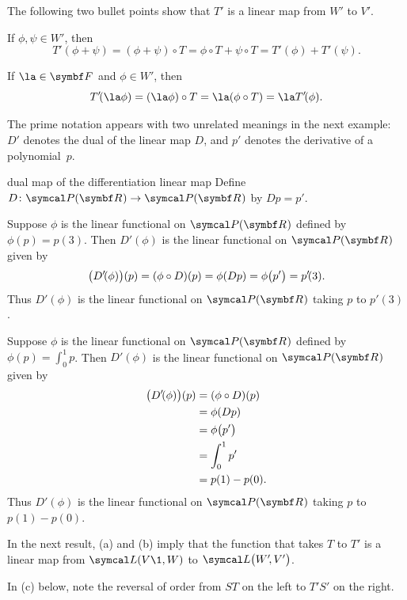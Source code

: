 The following two bullet points show that $T'$ is a linear map from $W'$ to $V'\!$.
\begin{Itemize}
\item
If $\phi, \psi \in W'\!$, then
\[
T' \! (\phi + \psi) = (\phi + \psi) \circ T = \phi \circ T + \psi \circ T = T' \! (\phi) + T' \! (\psi).
\]
\item
If $\la \in \F{}$ and $\phi \in W'\!$, then
\[
T' \! (\la \phi) = (\la \phi) \circ T = \la(\phi \circ T) = \la T' \! (\phi).
\]
\end{Itemize}

The prime notation appears with two unrelated meanings in the next example: $D'$ denotes the dual of the linear map $D$, and $p'$ denotes the derivative of a polynomial~$p$.

\begin{example}{dual map of the differentiation linear map}
Define $D \colon \P(\R{}) \to \P(\R{})$ by $Dp = p'\!$.
\vspace{-1bp}
\begin{Itemize}
\item
Suppose $\phi$ is the linear functional on $\P(\R{})$ defined by $\phi(p) = p(3)$. Then $D' \! (\phi)$ is the linear functional on $\P(\R{})$ given by
\[
\bigl(D' \! (\phi)\bigr)(p) = (\phi \circ D)(p) = \phi(Dp) = \phi\paren[\big]{p'} = p' \! (3).
\]
Thus $D' \! (\phi)$ is the linear functional on $\P(\R{})$ taking $p$ to $p' \! (3)$.
\item
Suppose $\phi$ is the linear functional on $\P(\R{})$ defined by $\phi(p) = \int_0^1 p$. Then $D' \! (\phi)$ is the linear functional on $\P(\R{})$ given by
\begin{align*}
\bigl(D' \! (\phi)\bigr)(p) &= (\phi \circ D)(p)\\
&= \phi(Dp)\\
&= \phi\paren[\big]{p'}\\
&= \int_0^1 p'\\
&= p(1) - p(0).
\end{align*}
Thus $D' \! (\phi)$ is the linear functional on $\P(\R{})$ taking $p$ to $p(1) - p(0)$.
\end{Itemize}
\vspace{-6.1bp}
\end{example}

 In the next result, (a) and (b) imply that the function that takes $T$ to $T'$ is a linear map from
$\L(V\1, W)$ to $\L\paren[\big]{W'\!, V'}$.

In (c) below, note the reversal of order from $ST$ on the left to $T' S'$ on the right.

